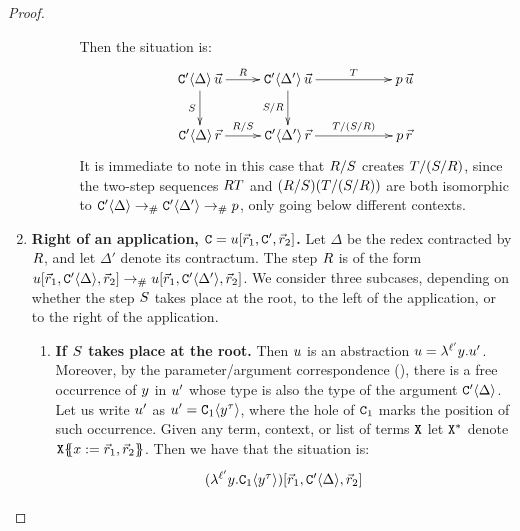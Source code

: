 \begin{proof}
\begin{enumerate}
\begin{enumerate}
\begin{enumerate}
          \label{stability:case_left_application:III:internal_left}
      Then the situation is:
      \[
        \xymatrix{
          \con'\of{\Delta}\,\ls{\tmthree}
          \ar[r]^-{\redex}
          \ar[d]_-{\redextwo}
        &
          \con'\of{\Delta'}\,\ls{\tmthree}
          \ar[d]_-{\redextwo/\redex}
          \ar[rr]^-{\redexthree}
        &&
          \tmfive\,\ls{\tmthree}
        \\
          \con'\of{\Delta}\,\ls{\tmfour}
          \ar[r]^-{\redex/\redextwo}
        &
          \con'\of{\Delta'}\,\ls{\tmfour}
          \ar[rr]^-{\redexthree/(\redextwo/\redex)}
        &&
          \tmfive\,\ls{\tmfour}
        }
      \]
      It is immediate to note in this case that $R/S$ creates $T/(S/R)$,
      since the two-step sequences $RT$ and $(R/S)(T/(S/R))$
      are both isomorphic to
      $\mathtt{C}'\langle\Delta\rangle \mathrel{\to_{\mathtt{\#}}} \mathtt{C}'\langle\Delta'\rangle \mathrel{\to_{\mathtt{\#}}} p$, only going below different contexts.
    \end{enumerate}
  \end{enumerate}
\item {\bf Right of an application, $\mathtt{C} = u[\vec{r}_1,\mathtt{C}',\vec{r}_2]$.}
  Let $\Delta$ be the redex contracted by $R$, and let $\Delta'$ denote its contractum.
  The step $R$ is of the form
  $u[\vec{r}_1,\mathtt{C}'\langle\Delta\rangle,\vec{r}_2] \mathrel{\to_{\mathtt{\#}}} u[\vec{r}_1,\mathtt{C}'\langle\Delta'\rangle,\vec{r}_2]$.
  We consider three subcases, depending on whether the step $S$ takes place at the root,
  to the left of the application, or to the right of the application.
  \begin{enumerate}
  \item {\bf If $S$ takes place at the root.}
    Then $u$ is an abstraction $u = \lambda^{\ell'} y. u'$.
    Moreover, by the parameter/argument correspondence (),
    there is a free occurrence of $y$ in $u'$ whose type is also the type of
    the argument $\mathtt{C}'\langle\Delta\rangle$. Let us write $u'$ as $u' = \mathtt{C}_1\langle y^\tau\rangle$,
    where the hole of $\mathtt{C}_1$ marks the position of such occurrence.
    Given any term, context, or list of terms $\mathtt{X}$ let $\mathtt{X}^*$ denote $\mathtt{X}\{\!\!\{x := \vec{r}_1,\vec{r}_2\}\!\!\}$.
    Then we have that the situation is:
    \[
      \xymatrix{
        (\lamp{\labtwo}{\vartwo}{\con_1\of{\vartwo^\typ}})[\ls{\tmfour}_1,\con'\of{\Delta},\ls{\tmfour}_2]
}\]
\end{enumerate}
\end{enumerate}
\end{proof}
